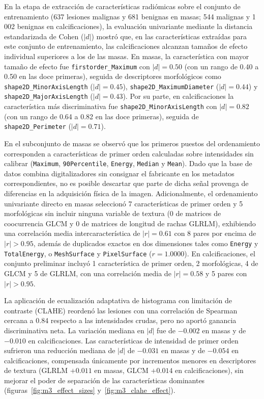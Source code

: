 En la etapa de extracción de características radiómicas sobre el conjunto de entrenamiento
(637 lesiones malignas y 681 benignas en masas; 544 malignas y 1\,002 benignas en calcificaciones),
la evaluación univariante mediante la distancia estandarizada de Cohen ($|d|$) mostró que, en las
características extraídas para este conjunto de entrenamiento, las calcificaciones alcanzan tamaños de efecto
individual superiores a los de las masas. En masas, la característica
con mayor tamaño de efecto fue \texttt{firstorder\_Maximum} con $|d| = 0.50$ (con un rango de 0.40 a 0.50
en las doce primeras), seguida de descriptores morfológicos como
\texttt{shape2D}\allowbreak\texttt{\_MinorAxisLength} ($|d| = 0.45$),
\texttt{shape2D}\allowbreak\texttt{\_MaximumDiameter} ($|d| = 0.44$)
y \texttt{shape2D}\allowbreak\texttt{\_MajorAxisLength} ($|d| = 0.43$). Por su parte, en calcificaciones
la característica más discriminativa fue \texttt{shape2D}\allowbreak\texttt{\_MinorAxisLength} con $|d| = 0.82$
(con un rango de 0.64 a 0.82 en las doce primeras), seguida de \texttt{shape2D}\allowbreak\texttt{\_Perimeter} ($|d| = 0.71$).

En el subconjunto de masas se observó que los primeros puestos del ordenamiento corresponden a
características de primer orden calculadas sobre intensidades sin calibrar (\texttt{Maximum}, \texttt{90Percentile},
\texttt{Energy}, \texttt{Median} y \texttt{Mean}). Dado que la base de datos combina digitalizadores sin consignar
el fabricante en los metadatos correspondientes, no es posible descartar que parte de dicha señal provenga de
diferencias en la adquisición física de la imagen. Adicionalmente, el ordenamiento univariante directo en masas
seleccionó 7 características de primer orden y 5 morfológicas sin incluir ninguna variable de textura
(0 de matrices de coocurrencia GLCM y 0 de matrices de longitud de rachas GLRLM), exhibiendo una correlación
media intercaracterística de $|r| = 0.61$ con 8 pares por encima de $|r| > 0.95$, además de duplicados exactos
en dos dimensiones tales como \texttt{Energy} y \texttt{TotalEnergy}, o \texttt{MeshSurface} y \texttt{PixelSurface} ($r = 1.0000$).
En calcificaciones, el conjunto preliminar incluyó 1 característica de primer orden, 2 morfológicas, 4 de GLCM
y 5 de GLRLM, con una correlación media de $|r| = 0.58$ y 5 pares con $|r| > 0.95$.

La aplicación de ecualización adaptativa de histograma con limitación de contraste (CLAHE)
reordenó las lesiones con una correlación de Spearman cercana a 0.84 respecto a las intensidades crudas,
pero no aportó ganancia discriminativa neta. La variación mediana en $|d|$ fue de $-0.002$ en masas
y de $-0.010$ en calcificaciones. Las características de intensidad de primer orden sufrieron una reducción
mediana de $|d|$ de $-0.031$ en masas y de $-0.054$ en calcificaciones, compensada únicamente por incrementos
menores en descriptores de textura (GLRLM $+0.011$ en masas, GLCM $+0.014$ en calcificaciones), sin mejorar
el poder de separación de las características dominantes (figuras~\ref{fig:m3_effect_sizes} y~\ref{fig:m3_clahe_effect}).

